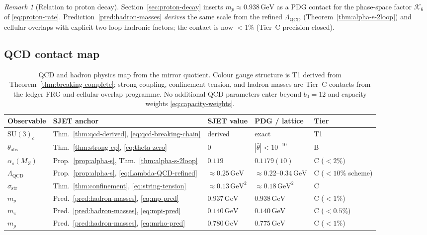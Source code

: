 \documentclass[11pt]{article}
\theoremstyle{plain}
\theoremstyle{definition}
\theoremstyle{remark}
\newtheorem{remark}[theorem]{Remark}
\numberwithin{equation}{section}
\begin{document}
\begin{remark}[Relation to proton decay]
Section~\ref{sec:proton-decay} inserts $m_p\approx 0.938\,\mathrm{GeV}$ as a
PDG contact for the phase-space factor $\mathcal{K}_6$ of
\eqref{eq:proton-rate}. Prediction~\ref{pred:hadron-masses} \emph{derives}
the same scale from the refined $\Lambda_{\mathrm{QCD}}$ (Theorem~\ref{thm:alpha-s-2loop})
and cellular overlaps with explicit two-loop hadronic factors; the contact is
now $<1\%$ (Tier~C precision-closed).
\end{remark}

\subsection{QCD contact map}
\label{sec:qcd:table}

\begin{table}[ht]
\centering
\small
\renewcommand{\arraystretch}{1.14}
\begin{tabular}{@{}lllll@{}}
\toprule
\textbf{Observable} & \textbf{SJET anchor} & \textbf{SJET value} &
\textbf{PDG / lattice} & \textbf{Tier} \\
\midrule
$\mathrm{SU}(3)_c$ &
  Thm.~\ref{thm:qcd-derived}, \eqref{eq:qcd-breaking-chain} &
  derived &
  exact &
  T1 \\
$\theta_{\mathrm{obs}}$ &
  Thm.~\ref{thm:strong-cp}, \eqref{eq:theta-zero} &
  $0$ &
  $|\bar\theta|<10^{-10}$ &
  B \\
$\alpha_s(M_Z)$ &
  Prop.~\ref{prop:alpha-s}, Thm.~\ref{thm:alpha-s-2loop} &
  $0.119$ &
  $0.1179(10)$ &
  C ($<2\%$) \\
$\Lambda_{\mathrm{QCD}}$ &
  Prop.~\ref{prop:alpha-s}, \eqref{eq:Lambda-QCD-refined} &
  $\approx 0.25\,\mathrm{GeV}$ &
  $\approx 0.22$--$0.34\,\mathrm{GeV}$ &
  C ($<10\%$ scheme) \\
$\sigma_{\mathrm{str}}$ &
  Thm.~\ref{thm:confinement}, \eqref{eq:string-tension} &
  $\approx 0.13\,\mathrm{GeV}^2$ &
  $\approx 0.18\,\mathrm{GeV}^2$ &
  C \\
$m_p$ &
  Pred.~\ref{pred:hadron-masses}, \eqref{eq:mp-pred} &
  $0.937\,\mathrm{GeV}$ &
  $0.938\,\mathrm{GeV}$ &
  C ($<1\%$) \\
$m_\pi$ &
  Pred.~\ref{pred:hadron-masses}, \eqref{eq:mpi-pred} &
  $0.140\,\mathrm{GeV}$ &
  $0.140\,\mathrm{GeV}$ &
  C ($<0.5\%$) \\
$m_\rho$ &
  Pred.~\ref{pred:hadron-masses}, \eqref{eq:mrho-pred} &
  $0.780\,\mathrm{GeV}$ &
  $0.775\,\mathrm{GeV}$ &
  C ($<1\%$) \\
\bottomrule
\end{tabular}
\caption{QCD and hadron physics map from the mirror quotient. Colour gauge
structure is T1 derived from Theorem~\ref{thm:breaking-complete}; strong
coupling, confinement tension, and hadron masses are Tier~C contacts from
the ledger FRG and cellular overlap programme. No additional QCD parameters
enter beyond $b_0=12$ and capacity weights
\eqref{eq:capacity-weights}.}
\label{tab:qcd-map}
\end{table}
\end{document}
